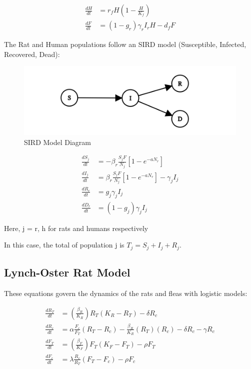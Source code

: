 \documentclass [letterpaper, 12pt] {article}
\begin{document}
\begin{align}
	\frac{dH}{dt} &= r_f H \left( 1 - \frac{H}{K_f} \right) \\
	\frac{dF}{dt} &= (1 - g_r) \gamma_r I_r H - d_f F
\end{align}

The Rat and Human populations follow an SIRD model (Susceptible, Infected, Recovered, Dead):

\begin{figure}[H]
	\centering
	\includegraphics[width=0.65\linewidth]{sird-graph.png}
	\caption{SIRD Model Diagram}
\end{figure}

\begin{align}
	\frac{dS_j}{dt} &= - \beta_r \frac{S_j F}{N_j} \left[ 1 - e^{-aN_r} \right] \\
	\frac{dI_j}{dt} &= \beta_r \frac{S_j F}{N_j} \left[ 1 - e^{-aN_r} \right] - \gamma_j I_j \\
	\frac{dR_r}{dt} &= g_j \gamma_j I_j \\
	\frac{dD_r}{dt} &= (1 - g_j) \gamma_j I_j
\end{align}

Here, j = r, h for rats and humans respectively

In this case, the total of population j is $T_j = S_j + I_j + R_j$.

\subsection{Lynch-Oster Rat Model}

These equations govern the dynamics of the rats and fleas with logistic models:

\begin{align}
	\frac{dR_T}{dt} &= (\frac{\beta_R}{K_R})R_T(K_R-R_T)-\delta R_c \\
	\frac{dR_c}{dt} &= \alpha \frac{F_c}{F_T} (R_T-R_c)-\frac{\beta_R}{K_R}(R_T)(R_c) - \delta R_c - \gamma R_c \\
	\frac{dF_T}{dt} &= (\frac{\beta_F}{K_F})F_T(K_F-F_T)-\rho F_T  \\
	\frac{dF_c}{dt} &= \lambda \frac{R_c}{R_T} (F_T-F_c) - \rho F_c 
\end{align}
\end{document}
